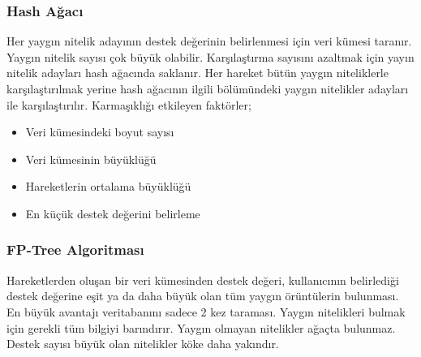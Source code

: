 \newpage

\subsubsection{Hash Ağacı}
Her yaygın nitelik adayının destek değerinin belirlenmesi için veri kümesi taranır. Yaygın nitelik sayısı çok büyük olabilir. Karşılaştırma sayısını azaltmak için yayın nitelik adayları hash ağacında saklanır. Her hareket bütün yaygın niteliklerle karşılaştırılmak yerine hash ağacının ilgili bölümündeki yaygın nitelikler adayları ile karşılaştırılır. Karmaşıklığı etkileyen faktörler;
\begin{itemize}
    \item Veri kümesindeki boyut sayısı
    \item Veri kümesinin büyüklüğü
    \item Hareketlerin ortalama büyüklüğü
    \item En küçük destek değerini belirleme
\end{itemize}

\newpage

\subsubsection{FP-Tree Algoritması}
Hareketlerden oluşan bir veri kümesinden destek değeri, kullanıcının belirlediği destek değerine eşit ya da daha büyük olan tüm yaygın örüntülerin bulunması. En büyük avantajı veritabanını sadece 2 kez taraması. Yaygın nitelikleri bulmak için gerekli tüm bilgiyi barındırır. Yaygın olmayan nitelikler ağaçta bulunmaz. Destek sayısı büyük olan nitelikler köke daha yakındır.

\newpage